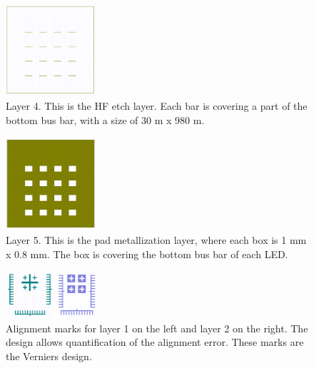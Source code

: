 \begin{figure}[h]
    \centering
    \includegraphics[width=0.3\textwidth]{figures/CleWin_L4.png}
    \caption{
        Layer 4. 
        This is the HF etch layer. 
        Each bar is covering a part of the bottom bus bar, with a size of 30 \textmu m x 980 \textmu m.
    }
    \label{fig:CleWin_L4}
\end{figure}

\begin{figure}[]
    \centering
    \includegraphics[width=0.3\textwidth]{figures/CleWin_L5.png}
    \caption{
        Layer 5. 
        This is the pad metallization layer, where each box is 1 mm x 0.8 mm. 
        The box is covering the bottom bus bar of each LED. 
    }
    \label{fig:CleWin_L5}
\end{figure}


\begin{figure}[]
    \centering
    \includegraphics[width=0.3\textwidth]{figures/CleWin_alignment_marks.png}
    \caption{
        Alignment marks for layer 1 on the left and layer 2 on the right. 
        The design allows quantification of the alignment error.
        These marks are the Verniers design. 
    }
    \label{fig:CleWin_alignment_marks}
\end{figure}

\newpage


